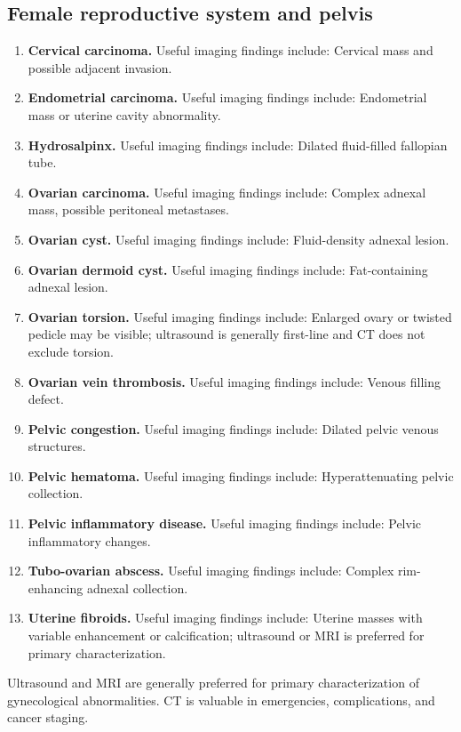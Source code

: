 \subsection{Female reproductive system and pelvis}
\begin{enumerate}[leftmargin=*,itemsep=0.45em,topsep=0.4em]
\item \textbf{Cervical carcinoma.} Useful imaging findings include: Cervical mass and possible adjacent invasion.
\item \textbf{Endometrial carcinoma.} Useful imaging findings include: Endometrial mass or uterine cavity abnormality.
\item \textbf{Hydrosalpinx.} Useful imaging findings include: Dilated fluid-filled fallopian tube.
\item \textbf{Ovarian carcinoma.} Useful imaging findings include: Complex adnexal mass, possible peritoneal metastases.
\item \textbf{Ovarian cyst.} Useful imaging findings include: Fluid-density adnexal lesion.
\item \textbf{Ovarian dermoid cyst.} Useful imaging findings include: Fat-containing adnexal lesion.
\item \textbf{Ovarian torsion.} Useful imaging findings include: Enlarged ovary or twisted pedicle may be visible; ultrasound is generally first-line and CT does not exclude torsion.
\item \textbf{Ovarian vein thrombosis.} Useful imaging findings include: Venous filling defect.
\item \textbf{Pelvic congestion.} Useful imaging findings include: Dilated pelvic venous structures.
\item \textbf{Pelvic hematoma.} Useful imaging findings include: Hyperattenuating pelvic collection.
\item \textbf{Pelvic inflammatory disease.} Useful imaging findings include: Pelvic inflammatory changes.
\item \textbf{Tubo-ovarian abscess.} Useful imaging findings include: Complex rim-enhancing adnexal collection.
\item \textbf{Uterine fibroids.} Useful imaging findings include: Uterine masses with variable enhancement or calcification; ultrasound or MRI is preferred for primary characterization.
\end{enumerate}

Ultrasound and MRI are generally preferred for primary characterization of gynecological abnormalities. CT is valuable in emergencies, complications, and cancer staging.

